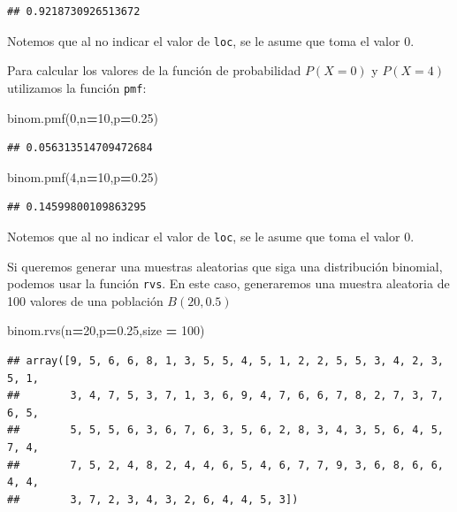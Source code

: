 \documentclass[]{book}
\newenvironment{Shaded}{\begin{snugshade}}{\end{snugshade}}
\newcommand{\DecValTok}[1]{\textcolor[rgb]{0.00,0.00,0.81}{#1}}
\newcommand{\FloatTok}[1]{\textcolor[rgb]{0.00,0.00,0.81}{#1}}
\newcommand{\NormalTok}[1]{#1}
\newcommand{\OperatorTok}[1]{\textcolor[rgb]{0.81,0.36,0.00}{\textbf{#1}}}
\begin{document}
\begin{verbatim}
## 0.9218730926513672
\end{verbatim}

Notemos que al no indicar el valor de \texttt{loc}, se le asume que toma el valor 0.

Para calcular los valores de la función de probabilidad \(P(X=0)\) y \(P(X=4)\) utilizamos la función \texttt{pmf}:

\begin{Shaded}
\begin{Highlighting}[]
\NormalTok{binom.pmf(}\DecValTok{0}\NormalTok{,n}\OperatorTok{=}\DecValTok{10}\NormalTok{,p}\OperatorTok{=}\FloatTok{0.25}\NormalTok{)}
\end{Highlighting}
\end{Shaded}

\begin{verbatim}
## 0.056313514709472684
\end{verbatim}

\begin{Shaded}
\begin{Highlighting}[]
\NormalTok{binom.pmf(}\DecValTok{4}\NormalTok{,n}\OperatorTok{=}\DecValTok{10}\NormalTok{,p}\OperatorTok{=}\FloatTok{0.25}\NormalTok{)}
\end{Highlighting}
\end{Shaded}

\begin{verbatim}
## 0.14599800109863295
\end{verbatim}

Notemos que al no indicar el valor de \texttt{loc}, se le asume que toma el valor 0.

Si queremos generar una muestras aleatorias que siga una distribución binomial, podemos usar la función \texttt{rvs}. En este caso, generaremos una muestra aleatoria de 100 valores de una población \(B(20,0.5)\)

\begin{Shaded}
\begin{Highlighting}[]
\NormalTok{binom.rvs(n}\OperatorTok{=}\DecValTok{20}\NormalTok{,p}\OperatorTok{=}\FloatTok{0.25}\NormalTok{,size }\OperatorTok{=} \DecValTok{100}\NormalTok{)}
\end{Highlighting}
\end{Shaded}

\begin{verbatim}
## array([9, 5, 6, 6, 8, 1, 3, 5, 5, 4, 5, 1, 2, 2, 5, 5, 3, 4, 2, 3, 5, 1,
##        3, 4, 7, 5, 3, 7, 1, 3, 6, 9, 4, 7, 6, 6, 7, 8, 2, 7, 3, 7, 6, 5,
##        5, 5, 5, 6, 3, 6, 7, 6, 3, 5, 6, 2, 8, 3, 4, 3, 5, 6, 4, 5, 7, 4,
##        7, 5, 2, 4, 8, 2, 4, 4, 6, 5, 4, 6, 7, 7, 9, 3, 6, 8, 6, 6, 4, 4,
##        3, 7, 2, 3, 4, 3, 2, 6, 4, 4, 5, 3])
\end{verbatim}
\end{document}
